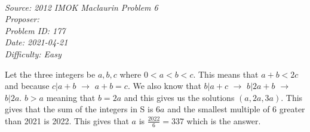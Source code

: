 \SSbreak\\
\emph{Source: 2012 IMOK Maclaurin Problem 6}\\
\emph{Proposer: \Palch}\\ %
\emph{Problem ID: 177}\\
\emph{Date: 2021-04-21}\\
\emph{Difficulty: Easy}\\
\SSbreak
 
\bigskip

\begin{solution}\hfil\medskip
	
	Let the three integers be \(a, b, c\) where \(0 < a < b < c\). This means that \(a + b < 2c\) and because \(c | a + b\) $\rightarrow$ \(a + b = c\). We also know that \(b|a + c \) $\rightarrow$ \(b|2a + b\) $\rightarrow$ \(b|2a\). \(b > a\) meaning that \(b = 2a\) and this gives us the solutions \((a, 2a, 3a)\). This gives that the sum of the integers in S is \(6a\) and the smallest multiple of 6 greater than 2021 is 2022. This gives that \(a\) is \(\frac{2022}{6} = \boxed{337}\) which is the answer. 
\end{solution}\bigskip
